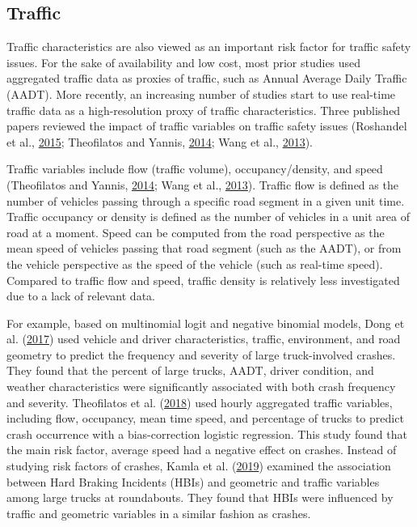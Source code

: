 \documentclass[12pt]{book}
\numberwithin{equation}{chapter}
\begin{document}
\hypertarget{traffic}{%
\subsection{Traffic}\label{traffic}}

Traffic characteristics are also viewed as an important risk factor for traffic safety issues. For the sake of availability and low cost, most prior studies used aggregated traffic data as proxies of traffic, such as Annual Average Daily Traffic (AADT). More recently, an increasing number of studies start to use real-time traffic data as a high-resolution proxy of traffic characteristics. Three published papers reviewed the impact of traffic variables on traffic safety issues (Roshandel et al., \protect\hyperlink{ref-roshandel2015impact}{2015}; Theofilatos and Yannis, \protect\hyperlink{ref-theofilatos2014review}{2014}; Wang et al., \protect\hyperlink{ref-wang2013effect}{2013}).

Traffic variables include flow (traffic volume), occupancy/density, and speed (Theofilatos and Yannis, \protect\hyperlink{ref-theofilatos2014review}{2014}; Wang et al., \protect\hyperlink{ref-wang2013effect}{2013}). Traffic flow is defined as the number of vehicles passing through a specific road segment in a given unit time. Traffic occupancy or density is defined as the number of vehicles in a unit area of road at a moment. Speed can be computed from the road perspective as the mean speed of vehicles passing that road segment (such as the AADT), or from the vehicle perspective as the speed of the vehicle (such as real-time speed). Compared to traffic flow and speed, traffic density is relatively less investigated due to a lack of relevant data.

For example, based on multinomial logit and negative binomial models, Dong et al. (\protect\hyperlink{ref-dong2017estimating}{2017}) used vehicle and driver characteristics, traffic, environment, and road geometry to predict the frequency and severity of large truck-involved crashes. They found that the percent of large trucks, AADT, driver condition, and weather characteristics were significantly associated with both crash frequency and severity. Theofilatos et al. (\protect\hyperlink{ref-theofilatos2018impact}{2018}) used hourly aggregated traffic variables, including flow, occupancy, mean time speed, and percentage of trucks to predict crash occurrence with a bias-correction logistic regression. This study found that the main risk factor, average speed had a negative effect on crashes. Instead of studying risk factors of crashes, Kamla et al. (\protect\hyperlink{ref-kamla2019analysing}{2019}) examined the association between Hard Braking Incidents (HBIs) and geometric and traffic variables among large trucks at roundabouts. They found that HBIs were influenced by traffic and geometric variables in a similar fashion as crashes.
\end{document}
